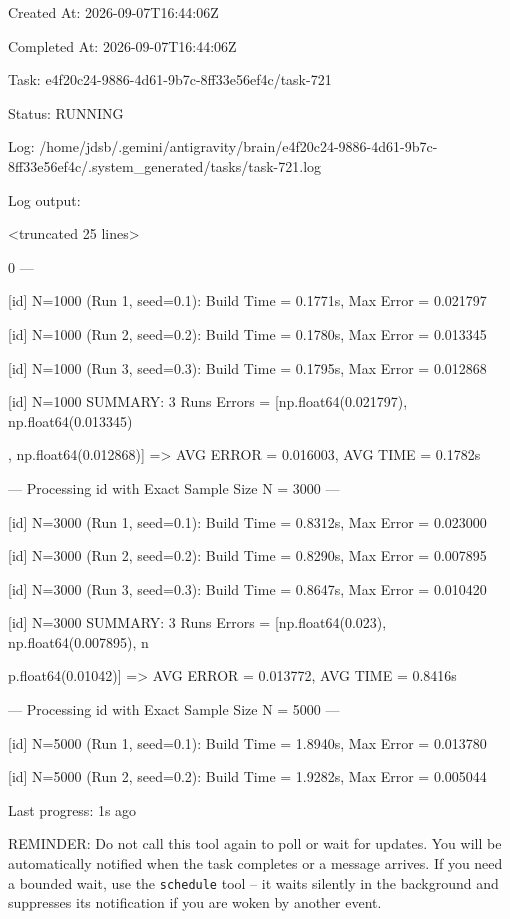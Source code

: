 \documentclass[11pt,a4paper]{article}
\begin{document}
Created At: 2026-09-07T16:44:06Z

Completed At: 2026-09-07T16:44:06Z

Task: e4f20c24-9886-4d61-9b7c-8ff33e56ef4c/task-721

Status: RUNNING

Log: /home/jdsb/.gemini/antigravity/brain/e4f20c24-9886-4d61-9b7c-8ff33e56ef4c/.system\_generated/tasks/task-721.log

Log output:

<truncated 25 lines>

0 ---

[id] N=1000 (Run 1, seed=0.1): Build Time = 0.1771s, Max Error = 0.021797

[id] N=1000 (Run 2, seed=0.2): Build Time = 0.1780s, Max Error = 0.013345

[id] N=1000 (Run 3, seed=0.3): Build Time = 0.1795s, Max Error = 0.012868

[id] N=1000 SUMMARY: 3 Runs Errors = [np.float64(0.021797), np.float64(0.013345)

, np.float64(0.012868)] => AVG ERROR = 0.016003, AVG TIME = 0.1782s

--- Processing id with Exact Sample Size N = 3000 ---

[id] N=3000 (Run 1, seed=0.1): Build Time = 0.8312s, Max Error = 0.023000

[id] N=3000 (Run 2, seed=0.2): Build Time = 0.8290s, Max Error = 0.007895

[id] N=3000 (Run 3, seed=0.3): Build Time = 0.8647s, Max Error = 0.010420

[id] N=3000 SUMMARY: 3 Runs Errors = [np.float64(0.023), np.float64(0.007895), n

p.float64(0.01042)] => AVG ERROR = 0.013772, AVG TIME = 0.8416s

--- Processing id with Exact Sample Size N = 5000 ---

[id] N=5000 (Run 1, seed=0.1): Build Time = 1.8940s, Max Error = 0.013780

[id] N=5000 (Run 2, seed=0.2): Build Time = 1.9282s, Max Error = 0.005044


Last progress: 1s ago



REMINDER: Do not call this tool again to poll or wait for updates. You will be automatically notified when the task completes or a message arrives. If you need a bounded wait, use the \texttt{schedule} tool -- it waits silently in the background and suppresses its notification if you are woken by another event.
\end{document}
